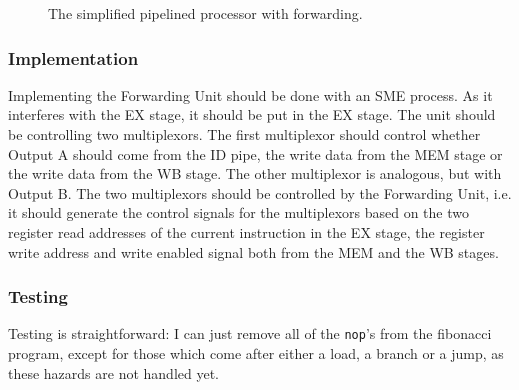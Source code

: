 \begin{figure}
{
    }
    \caption{The simplified pipelined processor with forwarding.}
    \label{fig:forw}
\end{figure}

\subsubsection*{Implementation}
Implementing the Forwarding Unit should be done with an SME process. As it
interferes with the EX stage, it should be put in the EX stage. The unit should
be controlling two multiplexors. The first multiplexor should control whether
Output A should come from the ID pipe, the write data from the MEM stage or the
write data from the WB stage. The other multiplexor is analogous, but with
Output B. The two multiplexors should be controlled by the Forwarding Unit,
i.e. it should generate the control signals for the multiplexors based on the
two register read addresses of the current instruction in the EX stage, the
register write address and write enabled signal both from the MEM and the WB
stages.

\subsubsection*{Testing}
Testing is straightforward: I can just remove all of the \texttt{nop}'s from
the fibonacci program, except for those which come after either a load, a
branch or a jump, as these hazards are not handled yet.

